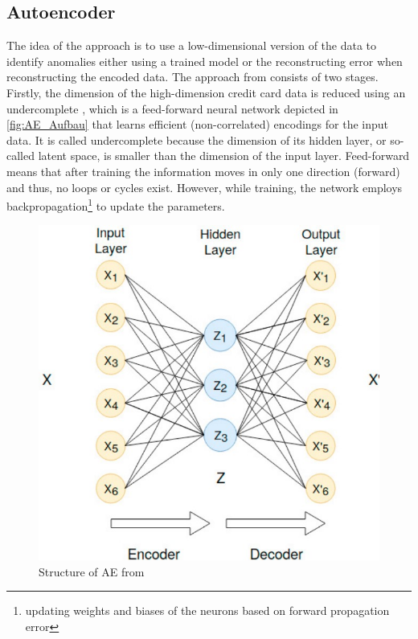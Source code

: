 \subsection{Autoencoder}

The idea of the approach is to use a low-dimensional version of the data to identify anomalies either using a trained model or the reconstructing error when reconstructing the encoded data.
The approach from \cite{cf_AE} consists of two stages. 
Firstly, the dimension of the high-dimension credit card data is reduced using an undercomplete , which is a feed-forward neural network depicted in \autoref{fig:AE_Aufbau} that learns efficient (non-correlated) encodings for the input data. It is called undercomplete because the dimension of its hidden layer, or so-called latent space, is smaller than the dimension of the input layer. Feed-forward means that after training the information moves in only one direction (forward) and thus, no loops or cycles exist. However, while training, the network employs backpropagation\footnote{updating weights and biases of the neurons based on forward propagation error} to update the parameters.
%
\begin{figure}[http]
    \begin{center}
      \includegraphics[scale=0.3]{images/AE_Aufbau.jpg}
      \caption{Structure of \ac{AE} from \cite{cf_AE}}
      \label{fig:AE_Aufbau}
    \end{center}
\end{figure}

